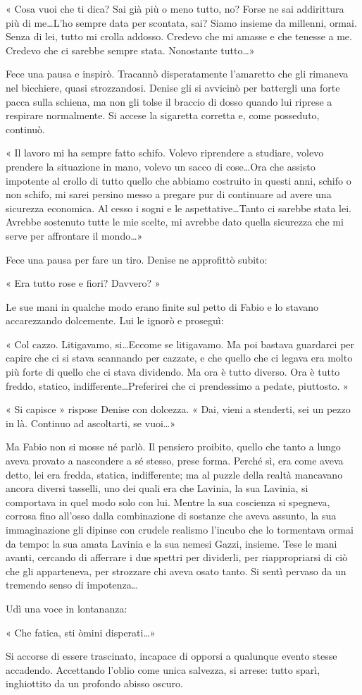 « Cosa vuoi che ti dica? Sai già più o meno tutto, no? Forse ne sai addirittura più di me\ldots L'ho sempre data per scontata, sai? Siamo insieme da millenni, ormai. Senza di lei, tutto mi crolla addosso. Credevo che mi amasse e che tenesse a me. Credevo che ci sarebbe sempre stata. Nonostante tutto\ldots »

Fece una pausa e inspirò. Tracannò disperatamente l'amaretto che gli rimaneva nel bicchiere, quasi strozzandosi. Denise gli si avvicinò per battergli una forte pacca sulla schiena, ma non gli tolse il braccio di dosso quando lui riprese a respirare normalmente. Si accese la sigaretta corretta e, come posseduto, continuò.

« Il lavoro mi ha sempre fatto schifo. Volevo riprendere a studiare, volevo prendere la situazione in mano, volevo un sacco di cose\ldots Ora che assisto impotente al crollo di tutto quello che abbiamo costruito in questi anni, schifo o non schifo, mi sarei persino messo a pregare pur di continuare ad avere una sicurezza economica. Al cesso i sogni e le aspettative\ldots Tanto ci sarebbe stata lei. Avrebbe sostenuto tutte le mie scelte, mi avrebbe dato quella sicurezza che mi serve per affrontare il mondo\ldots »

Fece una pausa per fare un tiro. Denise ne approfittò subito:

« Era tutto rose e fiori? Davvero? »

Le sue mani in qualche modo erano finite sul petto di Fabio e lo stavano accarezzando dolcemente. Lui le ignorò e proseguì:

« Col cazzo. Litigavamo, si\ldots Eccome se litigavamo. Ma poi bastava guardarci per capire che ci si stava scannando per cazzate, e che quello che ci legava era molto più forte di quello che ci stava dividendo. Ma ora è tutto diverso. Ora è tutto freddo, statico, indifferente\ldots Preferirei che ci prendessimo a pedate, piuttosto. »

« Si capisce » rispose Denise con dolcezza. « Dai, vieni a stenderti, sei un pezzo in là. Continuo ad ascoltarti, se vuoi\ldots »

Ma Fabio non si mosse né parlò. Il pensiero proibito, quello che tanto a lungo aveva provato a nascondere a sé stesso, prese forma. Perché sì, era come aveva detto, lei era fredda, statica, indifferente; ma al puzzle della realtà mancavano ancora diversi tasselli, uno dei quali era che Lavinia, la sua Lavinia, si comportava in quel modo solo con lui. Mentre la sua coscienza si spegneva, corrosa fino all'osso dalla combinazione di sostanze che aveva assunto, la sua immaginazione gli dipinse con crudele realismo l'incubo che lo tormentava ormai da tempo: la sua amata Lavinia e la sua nemesi Gazzi, insieme. Tese le mani avanti, cercando di afferrare i due spettri per dividerli, per riappropriarsi di ciò che gli apparteneva, per strozzare chi aveva osato tanto. Si sentì pervaso da un tremendo senso di impotenza\ldots

Udì una voce in lontananza:

« Che fatica, \textsc{}sti òmini disperati\ldots »

Si accorse di essere trascinato, incapace di opporsi a qualunque evento stesse accadendo. Accettando l'oblio come unica salvezza, si arrese: tutto sparì, inghiottito da un profondo abisso oscuro.
